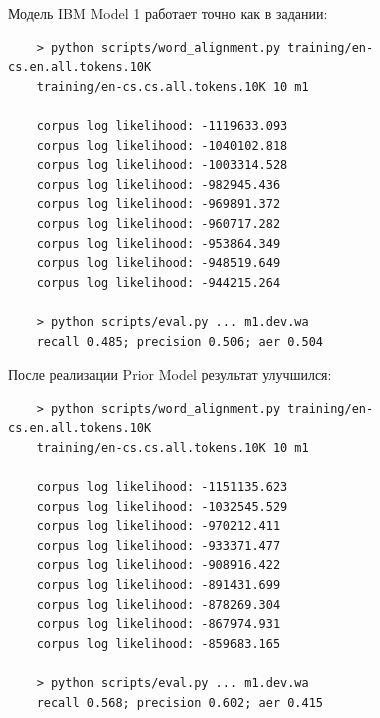 \documentclass[12pt, a4paper]{article}
\begin{document}
    Модель IBM Model 1 работает точно как в задании:
    \begin{verbatim}
    > python scripts/word_alignment.py training/en-cs.en.all.tokens.10K
    training/en-cs.cs.all.tokens.10K 10 m1

    corpus log likelihood: -1119633.093
    corpus log likelihood: -1040102.818
    corpus log likelihood: -1003314.528
    corpus log likelihood: -982945.436
    corpus log likelihood: -969891.372
    corpus log likelihood: -960717.282
    corpus log likelihood: -953864.349
    corpus log likelihood: -948519.649
    corpus log likelihood: -944215.264

    > python scripts/eval.py ... m1.dev.wa
    recall 0.485; precision 0.506; aer 0.504
    \end{verbatim}

    После реализации Prior Model результат улучшился:
    \begin{verbatim}
    > python scripts/word_alignment.py training/en-cs.en.all.tokens.10K
    training/en-cs.cs.all.tokens.10K 10 m1

    corpus log likelihood: -1151135.623
    corpus log likelihood: -1032545.529
    corpus log likelihood: -970212.411
    corpus log likelihood: -933371.477
    corpus log likelihood: -908916.422
    corpus log likelihood: -891431.699
    corpus log likelihood: -878269.304
    corpus log likelihood: -867974.931
    corpus log likelihood: -859683.165

    > python scripts/eval.py ... m1.dev.wa
    recall 0.568; precision 0.602; aer 0.415
    \end{verbatim}
\end{document}
